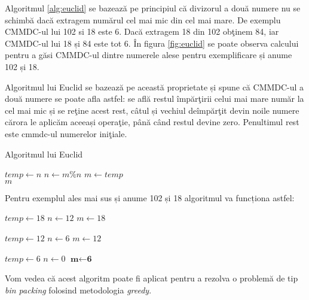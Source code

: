 Algoritmul \ref{alg:euclid} se bazează pe principiul că divizorul a două numere nu se schimbă dacă extragem numărul cel mai mic din cel mai mare. De exemplu CMMDC-ul lui 102 si 18 este 6. Dacă extragem 18 din 102 obţinem 84, iar CMMDC-ul lui 18 și 84 este tot 6. În figura \ref{fig:euclid} se poate observa calcului pentru a găsi CMMDC-ul dintre numerele alese pentru exemplificare și anume 102 și 18.




Algoritmul lui Euclid se bazează pe această proprietate și spune că CMMDC-ul a două numere se poate afla astfel: se află restul împărţirii celui mai mare număr la cel mai mic și se reţine acest rest, câtul și vechiul deîmpărţit devin noile numere cărora le aplicăm aceeași operaţie, până când restul devine zero. Penultimul rest este cmmdc-ul numerelor iniţiale. 

\begin{algorithm}[H]
	\caption{Algoritmul lui Euclid}\label{alg:euclid}
	\begin{algorithmic}[1]
		\State $temp \gets n$
		\State $n \gets m\%n$
		\State $m \gets temp$
		\EndWhile \\
		\Return $m$
		\EndProcedure
	\end{algorithmic}
\end{algorithm}

Pentru exemplul ales mai sus și anume 102 și 18 algoritmul va funcționa astfel:

\begin{algorithm}{}
	\begin{algorithmic}

		\State $temp \gets 18$
		\State $n \gets 12$
		\State $m \gets 18$
		\begin{addmargin}[2em]{0em}
		\State $temp \gets 12$
		\State $n \gets 6$
	    \State $m \gets 12$	
	    	\begin{addmargin}[2em]{0em}

		 \State $temp \gets 6$
		 \State $n \gets 0$
		 \State $\textbf{m} \gets \textbf{6}$
		 	    \end{addmargin}
		\end{addmargin}
	
	\end{algorithmic}
\end{algorithm}

Vom vedea că acest algoritm poate fi aplicat pentru a rezolva o problemă de tip \textit{bin packing} folosind metodologia \textit{greedy}.

